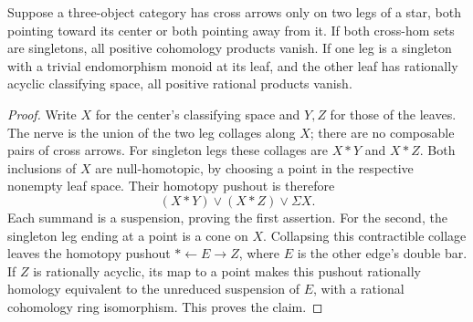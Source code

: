 \begin{lemma}
\label{C:star-cup-pruning}
Suppose a three-object category has cross arrows only on two legs of
a star, both pointing toward its center or both pointing away from it.
If both cross-hom sets are singletons, all positive cohomology products
vanish. If one leg is a singleton with a trivial endomorphism monoid
at its leaf, and the other leaf has rationally acyclic classifying
space, all positive rational products vanish.
\end{lemma}
\begin{proof}
Write $X$ for the center's classifying space and $Y,Z$ for those of
the leaves. The nerve is the union of the two leg collages along $X$;
there are no composable pairs of cross arrows. For singleton legs
these collages are $X*Y$ and $X*Z$. Both inclusions of $X$ are
null-homotopic, by choosing a point in the respective nonempty leaf
space. Their homotopy pushout is therefore
\[
 (X*Y)\vee(X*Z)\vee\Sigma X.
\]
Each summand is a suspension, proving the first assertion.
For the second, the singleton leg ending at a point is a cone on $X$.
Collapsing this contractible collage leaves the homotopy pushout
$*\leftarrow E\to Z$, where $E$ is the other edge's double bar.
If $Z$ is rationally acyclic, its map to a point makes this pushout
rationally homology equivalent to the unreduced suspension of $E$,
with a rational cohomology ring isomorphism. This proves the claim.
\end{proof}

